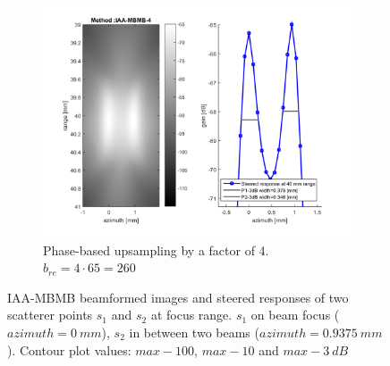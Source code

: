 \begin{figure}[ht]
    \quad
    \begin{subfigure}[t]{0.48\linewidth}
        \includegraphics[width=\linewidth]{./images/discussion/IAA-MBMB-phase4.png}
        \caption{Phase-based upsampling by a factor of 4. $b_{re} = 4 \cdot 65 =  260$}
        \label{fig:phase4}
    \end{subfigure}
\caption{IAA-MBMB beamformed images and steered responses of two scatterer points $s_1$ and $s_2$ at focus range. $s_1$ on beam focus ($azimuth = 0~mm$), $s_2$ in between two beams ($azimuth = 0.9375~mm$). Contour plot values: $max-100$, $max-10$ and $max-3~dB$}
\label{fig:phase_upsampling}
\end{figure}


